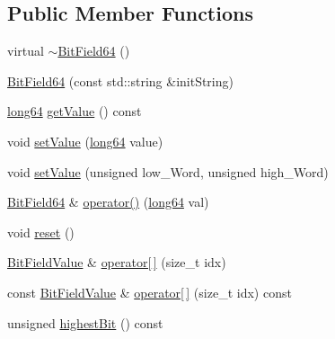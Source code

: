 \subsection*{Public Member Functions}
\begin{DoxyCompactItemize}
\item 
virtual \hyperlink{class_d_d4hep_1_1_d_d_segmentation_1_1_bit_field64_a8a82f357f0409ed81727b4de29590b95}{$\sim$\+Bit\+Field64} ()
\item 
\hyperlink{class_d_d4hep_1_1_d_d_segmentation_1_1_bit_field64_aa958402b4d1f8d79cf716397b9b642e4}{Bit\+Field64} (const std\+::string \&init\+String)
\item 
\hyperlink{namespace_d_d4hep_ac2a70e722b33dc7ddaa20db8954ac836}{long64} \hyperlink{class_d_d4hep_1_1_d_d_segmentation_1_1_bit_field64_aac1f1bf981c29946c1edb726c25a9eb6}{get\+Value} () const
\item 
void \hyperlink{class_d_d4hep_1_1_d_d_segmentation_1_1_bit_field64_a525ef87b1f0e9ff00a072102ac2f9457}{set\+Value} (\hyperlink{namespace_d_d4hep_ac2a70e722b33dc7ddaa20db8954ac836}{long64} value)
\item 
void \hyperlink{class_d_d4hep_1_1_d_d_segmentation_1_1_bit_field64_a0419ced4361da328259e8c71bdd28671}{set\+Value} (unsigned low\+\_\+\+Word, unsigned high\+\_\+\+Word)
\item 
\hyperlink{class_d_d4hep_1_1_d_d_segmentation_1_1_bit_field64}{Bit\+Field64} \& \hyperlink{class_d_d4hep_1_1_d_d_segmentation_1_1_bit_field64_af77a45d60bd3947bbfcd7822b06cbc9f}{operator()} (\hyperlink{namespace_d_d4hep_ac2a70e722b33dc7ddaa20db8954ac836}{long64} val)
\item 
void \hyperlink{class_d_d4hep_1_1_d_d_segmentation_1_1_bit_field64_af9f7362c6d23d8cce8669f8611def7e5}{reset} ()
\item 
\hyperlink{class_d_d4hep_1_1_d_d_segmentation_1_1_bit_field_value}{Bit\+Field\+Value} \& \hyperlink{class_d_d4hep_1_1_d_d_segmentation_1_1_bit_field64_aa04125e96306ce31f9aa042c4123c315}{operator\mbox{[}$\,$\mbox{]}} (size\+\_\+t idx)
\item 
const \hyperlink{class_d_d4hep_1_1_d_d_segmentation_1_1_bit_field_value}{Bit\+Field\+Value} \& \hyperlink{class_d_d4hep_1_1_d_d_segmentation_1_1_bit_field64_a47f84b0e8b89e9e45ecf502fb20b02f4}{operator\mbox{[}$\,$\mbox{]}} (size\+\_\+t idx) const
\item 
unsigned \hyperlink{class_d_d4hep_1_1_d_d_segmentation_1_1_bit_field64_ade7261b7a693ef039eb108ae218206f2}{highest\+Bit} () const
\item 

\end{DoxyCompactItemize}
